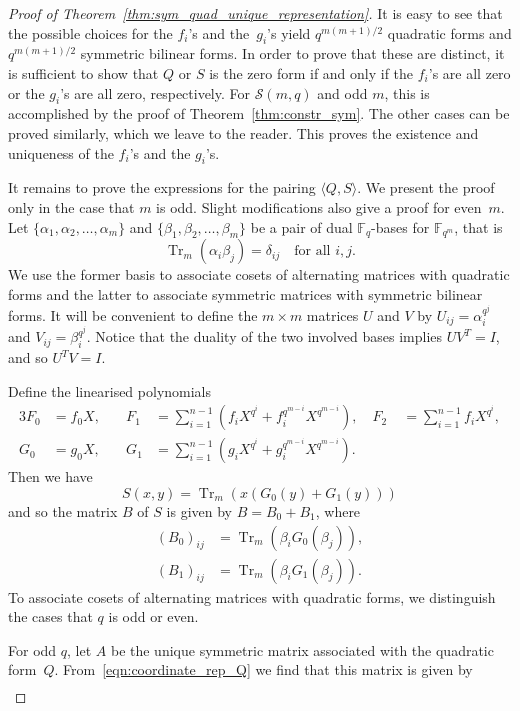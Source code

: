 \documentclass[10pt]{article}
\theoremstyle{definition}
\newcommand{\FF}{\mathbb{F}}
\renewcommand{\S}{\mathscr{S}}
\newcommand{\ang}[1]{\langle#1\rangle}
\DeclareMathOperator{\Tr}{Tr}
\begin{document}
\begin{proof}[Proof of Theorem~\ref{thm:sym_quad_unique_representation}]
It is easy to see that the possible choices for the $f_i$'s and the~$g_i$'s yield $q^{m(m+1)/2}$ quadratic forms and $q^{m(m+1)/2}$ symmetric bilinear forms. In order to prove that these are distinct, it is sufficient to show that $Q$ or $S$ is the zero form if and only if the $f_i$'s are all zero or the $g_i$'s are all zero, respectively. For $\S(m,q)$ and odd $m$, this is accomplished by the proof of Theorem~\ref{thm:constr_sym}. The other cases can be proved similarly, which we leave to the reader. This proves the existence and uniqueness of the $f_i$'s and the $g_i$'s.
\par
It remains to prove the expressions for the pairing $\ang{Q,S}$. We present the proof only in the case that $m$ is odd. Slight modifications also give a proof for even~$m$. Let $\{\alpha_1,\alpha_2,\dots,\alpha_m\}$ and $\{\beta_1,\beta_2,\dots,\beta_m\}$ be a pair of dual $\FF_q$-bases for $\FF_{q^m}$, that is
\[
\Tr_m(\alpha_i\beta_j)=\delta_{ij}\quad\text{for all $i,j$}.
\]
We use the former basis to associate cosets of alternating matrices with quadratic forms and the latter to associate symmetric matrices with symmetric bilinear forms. It will be convenient to define the $m\times m$ matrices $U$ and $V$ by $U_{ij}=\alpha_i^{q^j}$ and $V_{ij}=\beta_i^{q^j}$. Notice that the duality of the two involved bases implies $UV^T=I$, and so $U^TV=I$. 
\par
Define the linearised polynomials
\begin{alignat*}{3}
F_0&=f_0X, \quad & F_1&=\sum_{i=1}^{n-1}(f_iX^{q^i}+f_i^{q^{m-i}}X^{q^{m-i}}),\quad  F_2&\;=\sum_{i=1}^{n-1}f_iX^{q^i},\\
G_0&=g_0X, \quad & G_1&=\sum_{i=1}^{n-1}(g_iX^{q^i}+g_i^{q^{m-i}}X^{q^{m-i}}).
\end{alignat*}
Then we have
\[
S(x,y)=\Tr_m(x(G_0(y)+G_1(y)))
\]
and so the matrix $B$ of $S$ is given by $B=B_0+B_1$, where
\begin{align*}
(B_0)_{ij}&=\Tr_m(\beta_iG_0(\beta_j)),\\
(B_1)_{ij}&=\Tr_m(\beta_iG_1(\beta_j)).
\end{align*}
To associate cosets of alternating matrices with quadratic forms, we distinguish the cases that $q$ is odd or even.
\par
For odd $q$, let $A$ be the unique symmetric matrix associated with the quadratic form~$Q$. From~\eqref{eqn:coordinate_rep_Q} we find that this matrix is given by 
\begin{align*}

\end{align*}
\end{proof}
\end{document}
